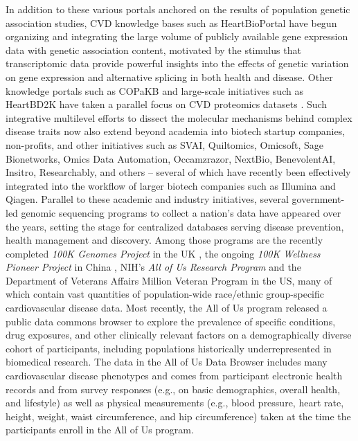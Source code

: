 \documentclass[letter]{bib}
\begin{document}
	In addition to these various portals anchored on the results of population genetic association studies, CVD knowledge bases such as HeartBioPortal \citep{Khomtchouk:2019:HeartBioPortal} have begun organizing and integrating the large volume of publicly available gene expression data with genetic association content, motivated by the stimulus that transcriptomic data provide powerful insights into the effects of genetic variation on gene expression and alternative splicing in both health and disease.  Other knowledge portals such as COPaKB \citep{Zong:2013:Integration} and large-scale initiatives such as HeartBD2K \citep{HeartBD2K} have taken a parallel focus on CVD proteomics datasets \citep{Lau:2016:large}.  Such integrative multilevel efforts to dissect the molecular mechanisms behind complex disease traits now also extend beyond academia into biotech startup companies, non-profits, and other initiatives such as SVAI, Quiltomics, Omicsoft, Sage Bionetworks, Omics Data Automation, Occamzrazor, NextBio, BenevolentAI, Insitro, Researchably, and others -- several of which have recently been effectively integrated into the workflow of larger biotech companies such as Illumina and Qiagen.  Parallel to these academic and industry initiatives, several government-led genomic sequencing programs to collect a nation's data have appeared over the years, setting the stage for centralized databases serving disease prevention, health management and discovery. Among those programs are the recently completed \textit{100K Genomes Project} in the UK \citep{Caulfield:2017:100K}, the ongoing \textit{100K Wellness Pioneer Project} in China \citep{Kalia:2017:China}, NIH's \textit{All of Us Research Program} \citep{NIH:2018:All} and the Department of Veterans Affairs Million Veteran Program \citep{Gaziano:2016:Million} in the US, many of which contain vast quantities of population-wide race/ethnic group-specific cardiovascular disease data.  Most recently, the All of Us program released a public data commons browser \citep{NIH:2019:All-Data-Browser} to explore the prevalence of specific conditions, drug exposures, and other clinically relevant factors on a demographically diverse cohort of participants, including populations historically underrepresented in biomedical research.  The data in the All of Us Data Browser includes many cardiovascular disease phenotypes and comes from participant electronic health records and from survey responses (e.g., on basic demographics, overall health, and lifestyle) as well as physical measurements (e.g., blood pressure, heart rate, height, weight, waist circumference, and hip circumference) taken at the time the participants enroll in the All of Us program.  
\end{document}

